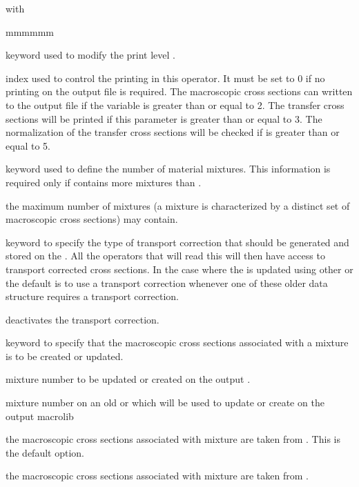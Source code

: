 \noindent with
\begin{ListeDeDescription}{mmmmmm}

\item[\moc{EDIT}] keyword used to modify the print level .

\item[\dusa{iprint}] index used to control the printing in this operator.
It must be set to 0 if no printing on the output file is required. The
macroscopic cross sections can written to the output file if the
variable  is greater than or equal to 2. The transfer cross
sections will be printed if this parameter is greater than or equal to 3. The
normalization of the transfer cross sections will be checked if 
is greater than or equal to 5.

\item[\moc{NMIX}] keyword used to define the number of material mixtures.
This information is required only if  contains more mixtures than .

\item[\dusa{nmixt}] the maximum number of mixtures (a mixture is
characterized by a distinct set of macroscopic cross sections) 
may contain.

\item[\moc{CTRA}] keyword to specify the type of transport correction that
should be generated and stored on the . All the operators that
will read this  will then have access to transport corrected
cross sections. In the case where the  is updated using other
 or  the default is to use a transport correction whenever one of these
older data structure requires a transport correction.

\item[\moc{OFF}] deactivates the transport correction.

\item[\moc{MIX}] keyword to specify that the macroscopic cross sections
associated with a mixture is to be created or updated.

\item[\dusa{numnew}] mixture number to be updated or created on the output
. 

\item[\dusa{numold}] mixture number on an old  or  which will be used
to update or create  on the output macrolib 

\item[\moc{OLDL}] the
macroscopic cross sections associated with mixture  are taken from . This is the
default option.

\item[\moc{UPDL}] the
macroscopic cross sections associated with mixture  are taken from .

\end{ListeDeDescription}

\eject
